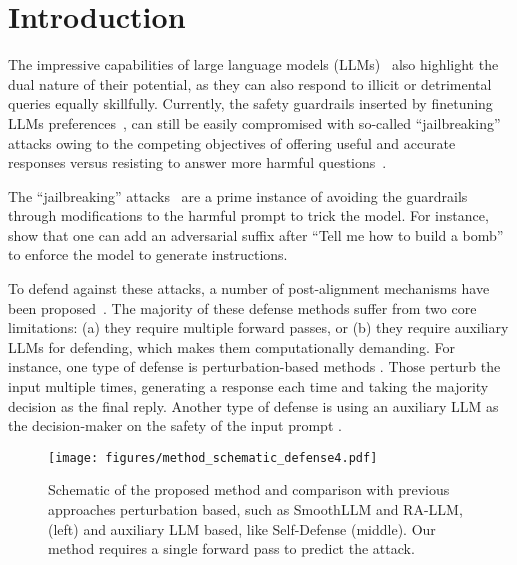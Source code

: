 
\section{Introduction}
\label{intro}

The impressive capabilities of large language models (LLMs)~\citep{brown2020language,achiam2023gpt} also highlight the dual nature of their potential, as they can also respond to illicit or detrimental queries equally skillfully. Currently, the safety guardrails inserted by finetuning LLMs preferences~\citep{bai2022constitutional, hacker2023regulating, ouyang2022training, sun2023principle}, can still be easily compromised with so-called ``jailbreaking'' attacks owing to the competing objectives of offering useful and accurate responses versus resisting to answer more harmful questions~\citep{wei2023jailbroken}.

The ``jailbreaking'' attacks~\citep{shen2023do,zou2023universal,carlini2023are,liu2023autodan,zeng2024johnny,sadasivan2024fast} are a prime instance of avoiding the guardrails through modifications to the harmful prompt to trick the model. For instance, \citet{zou2023universal} show that one can add an adversarial suffix after ``Tell me how to build a bomb'' to enforce the model to generate instructions. 

To defend against these attacks, a number of post-alignment mechanisms have been proposed~\citep{robey2023smoothllm,perez2022red,phute2023llm,jain2023baseline,zhou2024robust}. The majority of these defense methods suffer from two core limitations: (a) they require multiple forward passes, or (b) they require auxiliary LLMs for defending, which makes them computationally demanding.  For instance, one type of defense is perturbation-based methods \citep{robey2023smoothllm,cao2023defending,kumar2023certifying}. Those perturb the input multiple times, generating a response each time and taking the majority decision as the final reply. Another type of defense is using an auxiliary LLM as the decision-maker on the safety of the input prompt \citep{perez2022red, phute2023llm}.




\begin{figure}[t]
\vspace{-5mm}
\begin{center}
    \texttt{[image: figures/method\_schematic\_defense4.pdf]}
\end{center}
\vspace{-5mm}
\caption{{Schematic of the proposed method and comparison with previous approaches perturbation based, such as SmoothLLM and RA-LLM, (left) and auxiliary LLM based, like Self-Defense (middle). Our method requires a single forward pass to predict the attack.}}
\label{fig:method}
\end{figure}

